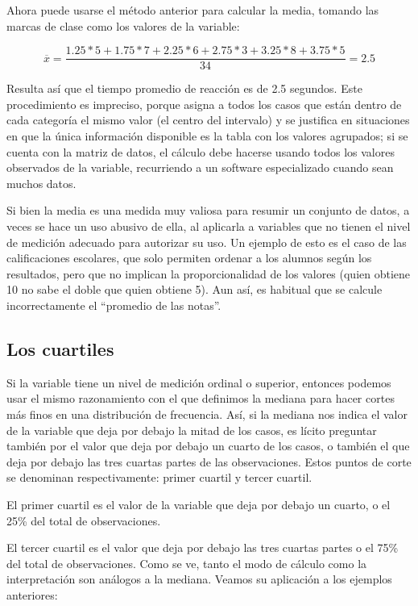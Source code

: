 \documentclass[]{book}
\begin{document}
Ahora puede usarse el método anterior para calcular la media, tomando
las marcas de clase como los valores de la variable:

\[\overline{x} = \frac{1.25*5 + 1.75*7 + 2.25*6 + 2.75*3 + 3.25*8 + 3.75*5}{34} = 2.5\]

Resulta así que el tiempo promedio de reacción es de 2.5 segundos. Este
procedimiento es impreciso, porque asigna a todos los casos que están
dentro de cada categoría el mismo valor (el centro del intervalo) y se
justifica en situaciones en que la única información disponible es la
tabla con los valores agrupados; si se cuenta con la matriz de datos, el
cálculo debe hacerse usando todos los valores observados de la variable,
recurriendo a un software especializado cuando sean muchos datos.

Si bien la media es una medida muy valiosa para resumir un conjunto de
datos, a veces se hace un uso abusivo de ella, al aplicarla a variables
que no tienen el nivel de medición adecuado para autorizar su uso. Un
ejemplo de esto es el caso de las calificaciones escolares, que solo
permiten ordenar a los alumnos según los resultados, pero que no
implican la proporcionalidad de los valores (quien obtiene 10 no sabe el
doble que quien obtiene 5). Aun así, es habitual que se calcule
incorrectamente el ``promedio de las notas''.

\hypertarget{los-cuartiles}{%
\subsection{Los cuartiles}\label{los-cuartiles}}

Si la variable tiene un nivel de medición ordinal o superior, entonces
podemos usar el mismo razonamiento con el que definimos la mediana para
hacer cortes más finos en una distribución de frecuencia. Así, si la
mediana nos indica el valor de la variable que deja por debajo la mitad
de los casos, es lícito preguntar también por el valor que deja por
debajo un cuarto de los casos, o también el que deja por debajo las tres
cuartas partes de las observaciones. Estos puntos de corte se denominan
respectivamente: primer cuartil y tercer cuartil.

El primer cuartil es el valor de la variable que deja por debajo un
cuarto, o el 25\% del total de observaciones.

El tercer cuartil es el valor que deja por debajo las tres cuartas
partes o el 75\% del total de observaciones. Como se ve, tanto el modo de
cálculo como la interpretación son análogos a la mediana. Veamos su
aplicación a los ejemplos anteriores:
\end{document}
